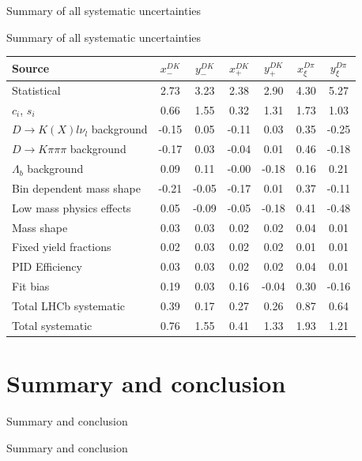 \documentclass{beamer}
\begin{document}
\begin{frame}{Summary of all systematic uncertainties}
  \begin{center}
    {\Large Summary of all systematic uncertainties}
  \end{center}
  \begin{tabular}{lcccccc} 
    \hline
    Source & $x_-^{DK}$ & $y_-^{DK}$ & $x_+^{DK}$ & $y_+^{DK}$ & $x_\xi^{D\pi}$ & $y_\xi^{D\pi}$ \\
    \hline
    Statistical                              & 2.73  & 3.23  & 2.38  & 2.90  & 4.30  & 5.27  \\
    \hline
    $c_i$, $s_i$                             & 0.66  & 1.55  & 0.32  & 1.31  & 1.73  & 1.03  \\
    \hline
    $D\to K(X)l\nu_l$ background             & -0.15 & 0.05  & -0.11 & 0.03  & 0.35  & -0.25 \\
    $D\to K\pi\pi\pi$ background             & -0.17 & 0.03  & -0.04 & 0.01  & 0.46  & -0.18 \\
    $\Lambda_b$ background                   & 0.09  & 0.11  & -0.00 & -0.18 & 0.16  & 0.21  \\
    Bin dependent mass shape                 & -0.21 & -0.05 & -0.17 & 0.01  & 0.37  & -0.11 \\
    Low mass physics effects                 & 0.05  & -0.09 & -0.05 & -0.18 & 0.41  & -0.48 \\
    Mass shape                               & 0.03  & 0.03  & 0.02  & 0.02  & 0.04  & 0.01  \\
    Fixed yield fractions                    & 0.02  & 0.03  & 0.02  & 0.02  & 0.01  & 0.01  \\
    PID Efficiency                           & 0.03  & 0.03  & 0.02  & 0.02  & 0.04  & 0.01  \\
    Fit bias                                 & 0.19  & 0.03  & 0.16  & -0.04 & 0.30  & -0.16 \\
    \hline
    Total LHCb systematic                    & 0.39  & 0.17  & 0.27  & 0.26  & 0.87  & 0.64  \\
    \hline
    Total systematic                         & 0.76  & 1.55  & 0.41  & 1.33  & 1.93  & 1.21  \\
    \hline
  \end{tabular}
\end{frame}

\section{Summary and conclusion}
\begin{frame}{Summary and conclusion}
  \begin{center}
    {\huge Summary and conclusion}
  \end{center}
\end{frame}
\end{document}
